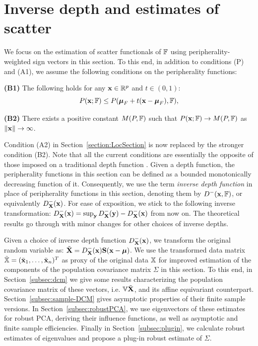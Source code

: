 \section{Inverse depth and estimates of scatter}
\label{section:dcmSection}
We focus on the estimation of scatter functionals of ${\mathbb{F}}$ using peripherality-weighted sign vectors in this section. To this end, in addition to conditions (P) and (A1), we assume the following conditions on the peripherality functions:

\vspace{1em}
\noindent\textbf{(B1)} The following holds for any ${\bf{x}} \in {\mathbb{R}}^p$ and $t \in (0,1)$:
%
$$
P({\bf{x}}; {\mathbb{F}}) \leq P({\boldsymbol{\mu}}_F + t({\bf{x}} - {\boldsymbol{\mu}}_F), {\mathbb{F}}),
$$
%

\noindent\textbf{(B2)} There exists a positive constant $M(P,{\mathbb{F}}) $ such that $P({\bf{x}}; {\mathbb{F}}) \rightarrow M(P,{\mathbb{F}})$ as $\|{\bf{x}}\| \rightarrow \infty $.
\vspace{1em}

Condition (A2) in Section~\ref{section:LocSection} is now replaced by the stronger condition (B2). Note that all the current conditions are essentially the opposite of those imposed on a traditional depth function \citep{zuo00}. Given a depth function, the peripherality functions in this section can be defined as a bounded monotonically decreasing function of it. Consequently, we use the term {\it inverse depth function} \citep{MajumdarChatterjeeStat} in place of peripherality functions in this section, denoting them by $D^-({\bf{x}},{\mathbb{F}})$, or equivalently $D^-_{\mathbf{X}}({\bf{x}})$. For ease of exposition, we stick to the following inverse transformation: $D^-_{\mathbf{X}}({\bf{x}}) = \sup_{\bf{y}} D^-_{\mathbf{X}}({\bf{y}}) - D^-_{\mathbf{X}}({\bf{x}})$ from now on. The theoretical results go through with minor changes for other choices of inverse depths.

Given a choice of inverse depth function $D^-_{{\mathbf{X}}}({\bf{x}})$, we transform the original random variable as: $\tilde {{\mathbf{X}}} = D^-_{\mathbf{X}}({\bf{x}}) {\mathbf{S}}({\bf{x}} - {\boldsymbol{\mu}})$. We use the transformed data matrix $\tilde {{\mathbb{X}}} = (\tilde {{\bf{x}}}_1, \ldots, \tilde {{\bf{x}}}_n)^T$ as proxy of the original data ${\mathbb{X}}$ for improved estimation of the components of the population covariance matrix $\Sigma$ in this section. To this end, in Section~\ref{subsec:dcm} we give some results characterizing the population covariance matrix of these vectors, i.e. ${\mathbb{V}} \tilde {{\mathbf{X}}}$, and its affine equivariant counterpart. Section~\ref{subsec:sample-DCM} gives asymptotic properties of their finite sample versions. In Section~\ref{subsec:robustPCA}, we use eigenvectors of these estimates for robust PCA, deriving their influence functions, as well as asymptotic and finite sample efficiencies. Finally in Section~\ref{subsec:plugin}, we calculate robust estimates of eigenvalues and propose a plug-in robust estimate of $\Sigma$.

